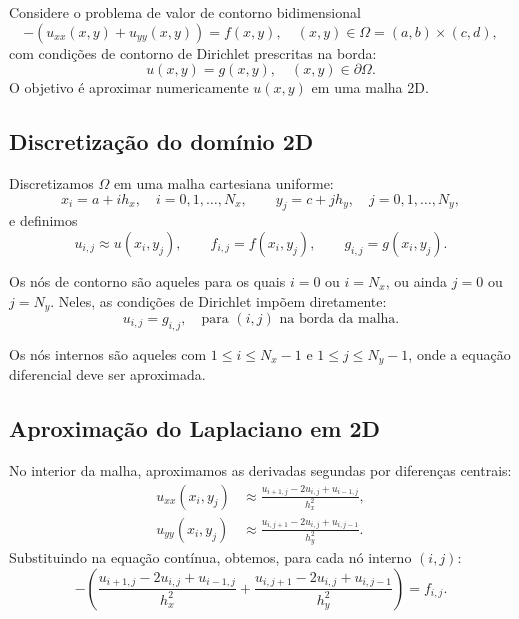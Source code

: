 Considere o problema de valor de contorno bidimensional
\begin{equation}
    -\left(u_{xx}(x,y) + u_{yy}(x,y)\right) = f(x,y), 
    \quad (x,y) \in \Omega = (a,b) \times (c,d),
\end{equation}
com condições de contorno de Dirichlet prescritas na borda:
\begin{equation}
    u(x,y) = g(x,y), \quad (x,y) \in \partial\Omega.
\end{equation}
O objetivo é aproximar numericamente $u(x,y)$ em uma malha 2D.

\subsection{Discretização do domínio 2D}

Discretizamos $\Omega$ em uma malha cartesiana uniforme:
\begin{equation}
    x_i = a + i h_x, \quad i = 0,1,\dots,N_x,
    \qquad
    y_j = c + j h_y, \quad j = 0,1,\dots,N_y,
\end{equation}
e definimos
\begin{equation}
    u_{i,j} \approx u(x_i,y_j), 
    \qquad
    f_{i,j} = f(x_i,y_j), 
    \qquad
    g_{i,j} = g(x_i,y_j).
\end{equation}

Os nós de contorno são aqueles para os quais $i=0$ ou $i=N_x$, ou ainda 
$j=0$ ou $j=N_y$. Neles, as condições de Dirichlet impõem diretamente:
\begin{equation}
    u_{i,j} = g_{i,j}, \quad \text{para } (i,j) \text{ na borda da malha}.
\end{equation}

Os nós internos são aqueles com $1 \le i \le N_x-1$ e 
$1 \le j \le N_y-1$, onde a equação diferencial deve ser aproximada.

\subsection{Aproximação do Laplaciano em 2D}

No interior da malha, aproximamos as derivadas segundas por diferenças centrais:
\begin{align}
    u_{xx}(x_i,y_j) &\approx 
    \frac{u_{i+1,j} - 2u_{i,j} + u_{i-1,j}}{h_x^2}, \\
    u_{yy}(x_i,y_j) &\approx 
    \frac{u_{i,j+1} - 2u_{i,j} + u_{i,j-1}}{h_y^2}.
\end{align}
Substituindo na equação contínua, obtemos, para cada nó interno $(i,j)$:
\begin{equation}
    -\left(
      \frac{u_{i+1,j} - 2u_{i,j} + u_{i-1,j}}{h_x^2}
      + 
      \frac{u_{i,j+1} - 2u_{i,j} + u_{i,j-1}}{h_y^2}
    \right)
    = f_{i,j}.
\end{equation}

